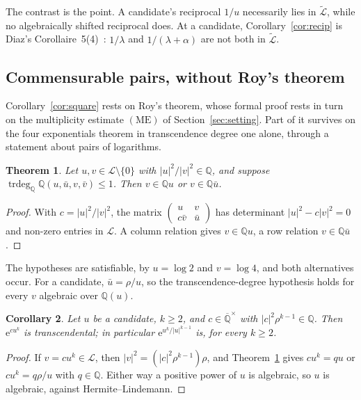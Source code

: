 \documentclass[11pt,a4paper]{article}
\theoremstyle{plain}
\newtheorem{theorem}{Theorem}[section]
\newtheorem{corollary}[theorem]{Corollary}
\theoremstyle{definition}
\newcommand{\e}{\mathrm{e}}
\newcommand{\Q}{\mathbb{Q}}
\newcommand{\Alg}{\overline{\mathbb{Q}}}
\newcommand{\Logs}{\mathcal{L}}
\newcommand{\aLogs}{\widetilde{\mathcal{L}}}
\DeclareMathOperator{\trdeg}{trdeg}
\begin{document}
The contrast is the point. A candidate's reciprocal $1/u$ necessarily lies in $\aLogs$, while no
algebraically shifted reciprocal does. At a candidate, Corollary~\ref{cor:recip} is Diaz's
Corollaire~5(4)~\cite{diaz-2007}: $1/\lambda$ and $1/(\lambda+\alpha)$ are not both in $\aLogs$.

\subsection*{Commensurable pairs, without Roy's theorem}

Corollary~\ref{cor:square} rests on Roy's theorem, whose formal proof rests in turn on the multiplicity
estimate $(\mathrm{ME})$ of Section~\ref{sec:setting}. Part of it survives
on the four exponentials theorem in transcendence degree one alone, through a statement about
pairs of logarithms.

\begin{theorem}\label{thm:pair}
Let $u,v\in\Logs\setminus\{0\}$ with $|u|^{2}/|v|^{2}\in\Q$, and suppose
$\trdeg_{\Q}\Q(u,\bar u,v,\bar v)\le1$. Then $v\in\Q u$ or $v\in\Q\bar u$.
\end{theorem}

\begin{proof}
With $c=|u|^{2}/|v|^{2}$, the matrix $\begin{pmatrix}u&v\\ c\bar v&\bar u\end{pmatrix}$ has
determinant $|u|^{2}-c|v|^{2}=0$ and non-zero entries in $\Logs$. A column relation gives
$v\in\Q u$, a row relation $v\in\Q\bar u$.
\end{proof}

The hypotheses are satisfiable, by $u=\log2$ and $v=\log4$, and both alternatives occur. For a
candidate, $\bar u=\rho/u$, so the transcendence-degree hypothesis holds for every $v$ algebraic
over $\Q(u)$.

\begin{corollary}\label{cor:monomial}
Let $u$ be a candidate, $k\ge2$, and $c\in\Alg^{\times}$ with $|c|^{2}\rho^{k-1}\in\Q$. Then
$\e^{cu^{k}}$ is transcendental; in particular $\e^{u^{k}/|u|^{k-1}}$ is, for every $k\ge2$.
\end{corollary}

\begin{proof}
If $v=cu^{k}\in\Logs$, then $|v|^{2}=(|c|^{2}\rho^{k-1})\rho$, and Theorem~\ref{thm:pair} gives
$cu^{k}=qu$ or $cu^{k}=q\rho/u$ with $q\in\Q$. Either way a positive power of $u$ is algebraic, so
$u$ is algebraic, against Hermite--Lindemann.
\end{proof}
\end{document}
